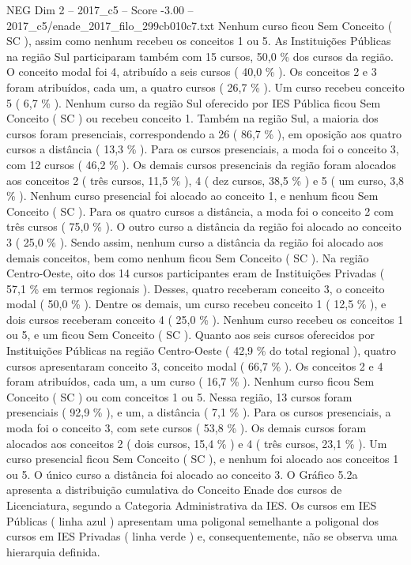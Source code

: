 \begin{textsample}{NEG Dim 2 – 2017\_c5 – Score -3.00 – 2017\_c5/enade\_2017\_filo\_299cb010c7.txt}
Nenhum curso ficou Sem Conceito ( SC ), assim como nenhum recebeu os conceitos 1 ou 5.
As Instituições Públicas na região Sul participaram também com 15 cursos, 50,0 \% dos cursos da região.
O conceito modal foi 4, atribuído a seis cursos ( 40,0 \% ).
Os conceitos 2 e 3 foram atribuídos, cada um, a quatro cursos ( 26,7 \% ).
Um curso recebeu conceito 5 ( 6,7 \% ).
Nenhum curso da região Sul oferecido por IES Pública ficou Sem Conceito ( SC ) ou recebeu conceito 1.
Também na região Sul, a maioria dos cursos foram presenciais, correspondendo a 26 ( 86,7 \% ), em oposição aos quatro cursos a distância ( 13,3 \% ).
Para os cursos presenciais, a moda foi o conceito 3, com 12 cursos ( 46,2 \% ).
Os demais cursos presenciais da região foram alocados aos conceitos 2 ( três cursos, 11,5 \% ), 4 ( dez cursos, 38,5 \% ) e 5 ( um curso, 3,8 \% ).
Nenhum curso presencial foi alocado ao conceito 1, e nenhum ficou Sem Conceito ( SC ).
Para os quatro cursos a distância, a moda foi o conceito 2 com três cursos ( 75,0 \% ).
O outro curso a distância da região foi alocado ao conceito 3 ( 25,0 \% ).
Sendo assim, nenhum curso a distância da região foi alocado aos demais conceitos, bem como nenhum ficou Sem Conceito ( SC ).
Na região Centro-Oeste, oito dos 14 cursos participantes eram de Instituições Privadas ( 57,1 \% em termos regionais ).
Desses, quatro receberam conceito 3, o conceito modal ( 50,0 \% ).
Dentre os demais, um curso recebeu conceito 1 ( 12,5 \% ), e dois cursos receberam conceito 4 ( 25,0 \% ).
Nenhum curso recebeu os conceitos 1 ou 5, e um ficou Sem Conceito ( SC ).
Quanto aos seis cursos oferecidos por Instituições Públicas na região Centro-Oeste ( 42,9 \% do total regional ), quatro cursos apresentaram conceito 3, conceito modal ( 66,7 \% ).
Os conceitos 2 e 4 foram atribuídos, cada um, a um curso ( 16,7 \% ).
Nenhum curso ficou Sem Conceito ( SC ) ou com conceitos 1 ou 5.
Nessa região, 13 cursos foram presenciais ( 92,9 \% ), e um, a distância ( 7,1 \% ).
Para os cursos presenciais, a moda foi o conceito 3, com sete cursos ( 53,8 \% ).
Os demais cursos foram alocados aos conceitos 2 ( dois cursos, 15,4 \% ) e 4 ( três cursos, 23,1 \% ).
Um curso presencial ficou Sem Conceito ( SC ), e nenhum foi alocado aos conceitos 1 ou 5.
O único curso a distância foi alocado ao conceito 3.
O Gráfico 5.2a apresenta a distribuição cumulativa do Conceito Enade dos cursos de Licenciatura, segundo a Categoria Administrativa da IES.
Os cursos em IES Públicas ( linha azul ) apresentam uma poligonal semelhante a poligonal dos cursos em IES Privadas ( linha verde ) e, consequentemente, não se observa uma hierarquia definida.

\end{textsample}
